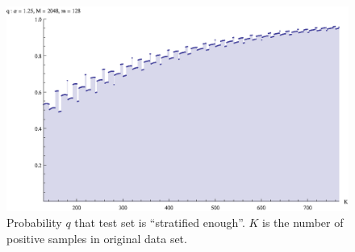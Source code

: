 \documentclass[11pt,twoside,a4paper]{book}
\begin{document}
\begin{figure}[h]
\begin{center}
\includegraphics{figures/hyper}
\caption[Plot of probability that test set is ``stratified enough'']{Probability $q$ that test set is ``stratified enough''.
$K$ is the number of positive samples in original data set.}
\label{fig:hyper}
\end{center}
\end{figure}
\end{document}
